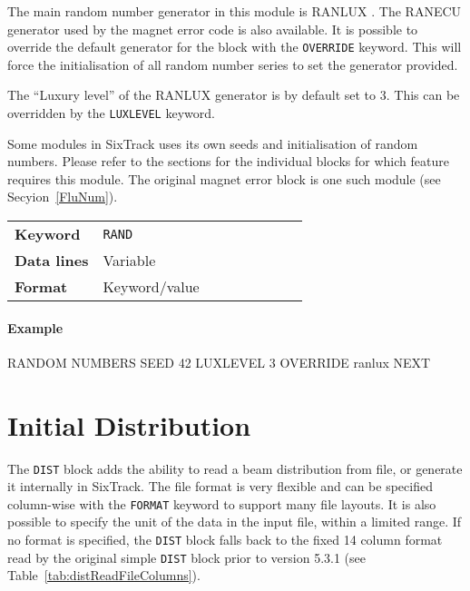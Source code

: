 The main random number generator in this module is RANLUX \cite{ranlux}.
The RANECU \cite{ranecu1,ranecu2} generator used by the magnet error code is also available.
It is possible to override the default generator for the block with the \texttt{OVERRIDE} keyword.
This will force the initialisation of all random number series to set the generator provided.

The ``Luxury level'' of the RANLUX generator is by default set to 3.
This can be overridden by the \texttt{LUXLEVEL} keyword.

Some modules in SixTrack uses its own seeds and initialisation of random numbers.
Please refer to the sections for the individual blocks for which feature requires this module.
The original magnet error block is one such module (see Secyion~\ref{FluNum}).

\bigskip
\begin{tabular}{@{}lp{0.7\linewidth}}
    \textbf{Keyword}    & \texttt{RAND}\index{RAND} \\
    \textbf{Data lines} & Variable \\
    \textbf{Format}     & Keyword/value
\end{tabular}

\paragraph{Example}

\begin{cverbatim}
RANDOM NUMBERS
  SEED 42
  LUXLEVEL 3
  OVERRIDE ranlux
NEXT
\end{cverbatim}

\section{Initial Distribution} \label{distBlock}

The \texttt{DIST} block adds the ability to read a beam distribution from file, or generate it internally in SixTrack.
The file format is very flexible and can be specified column-wise with the \texttt{FORMAT} keyword to support many file layouts.
It is also possible to specify the unit of the data in the input file, within a limited range.
If no format is specified, the \texttt{DIST} block falls back to the fixed 14 column format read by the original simple \texttt{DIST} block prior to version 5.3.1 (see Table~\ref{tab:distReadFileColumns}).

